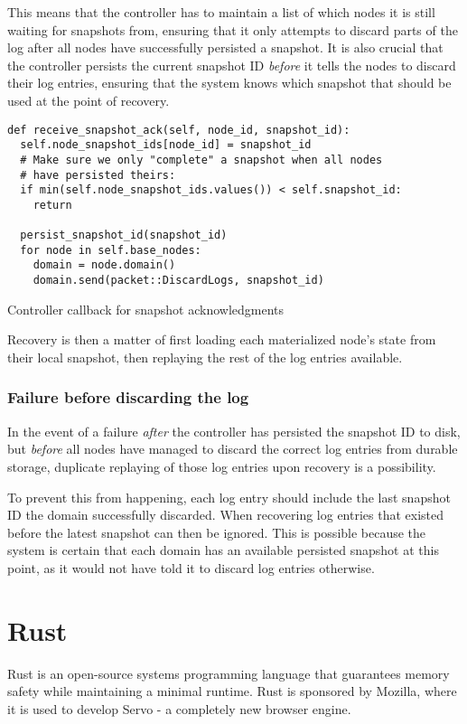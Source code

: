 \documentclass[b5paper]{report}
\begin{document}
This means that the controller has to maintain a list of which nodes it is still
waiting for snapshots from, ensuring that it only attempts to discard parts of
the log after all nodes have successfully persisted a snapshot. It is also
crucial that the controller persists the current snapshot ID \textit{before} it
tells the nodes to discard their log entries, ensuring that the system knows
which snapshot that should be used at the point of recovery.

\begin{listing}[H]
  \begin{verbatim}
def receive_snapshot_ack(self, node_id, snapshot_id):
  self.node_snapshot_ids[node_id] = snapshot_id
  # Make sure we only "complete" a snapshot when all nodes
  # have persisted theirs:
  if min(self.node_snapshot_ids.values()) < self.snapshot_id:
    return

  persist_snapshot_id(snapshot_id)
  for node in self.base_nodes:
    domain = node.domain()
    domain.send(packet::DiscardLogs, snapshot_id)
  \end{verbatim}
  \caption{Controller callback for snapshot acknowledgments}
\end{listing}

Recovery is then a matter of first loading each materialized node's state from
their local snapshot, then replaying the rest of the log entries available.

\subsubsection{Failure before discarding the log}
In the event of a failure \textit{after} the controller has persisted the
snapshot ID to disk, but \textit{before} all nodes have managed to discard the
correct log entries from durable storage, duplicate replaying of those log
entries upon recovery is a possibility.

To prevent this from happening, each log
entry should include the last snapshot ID the domain successfully discarded.
When recovering log entries that existed before the latest snapshot can then be
ignored. This is possible because the system is certain that each domain has an
available persisted snapshot at this point, as it would not have told it to
discard log entries otherwise.

\section{Rust}
Rust \cite{rust} is an open-source systems programming language that guarantees memory
safety while maintaining a minimal runtime. Rust is sponsored by Mozilla, where
it is used to develop Servo - a completely new browser engine.
\end{document}
